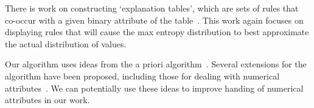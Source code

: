 \documentclass{sig-alternate}
\begin{document}
There is work on constructing `explanation tables', which are sets of rules that co-occur with a given binary attribute of the table~\cite{DBLP:journals/pvldb/GebalyAGKS14}. This work again focuses on displaying rules that will cause the max entropy distribution to best approximate the actual distribution of values. 

Our algorithm uses ideas from the a priori algorithm~\cite{apriori}. Several extensions for the algorithm have been proposed, including those for dealing with numerical attributes~\cite{Srikant:1996:MQA:233269.233311}. We can potentially use these ideas to improve handing of numerical attributes in our work. 


{\small 


}
\end{document}
